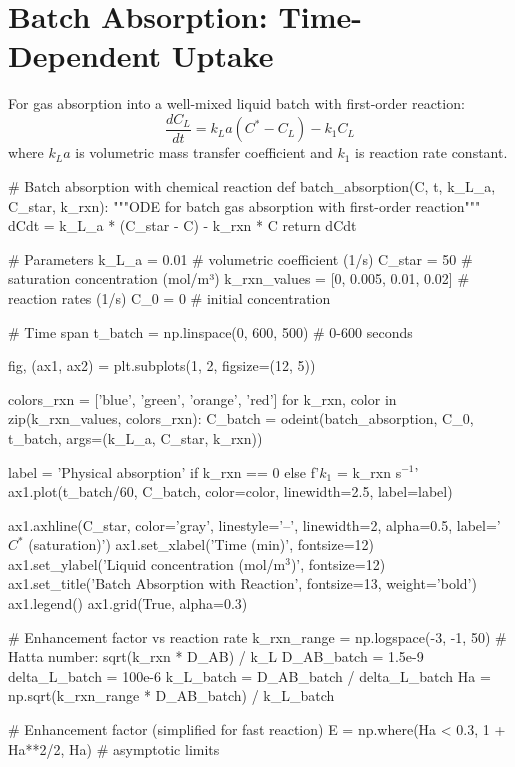 \documentclass[11pt,a4paper]{article}
\begin{document}
\section{Batch Absorption: Time-Dependent Uptake}

For gas absorption into a well-mixed liquid batch with first-order reaction:
\begin{equation}
\frac{dC_L}{dt} = k_L a (C^* - C_L) - k_1 C_L
\end{equation}
where $k_L a$ is volumetric mass transfer coefficient and $k_1$ is reaction rate constant.

\begin{pycode}
# Batch absorption with chemical reaction
def batch_absorption(C, t, k_L_a, C_star, k_rxn):
    """ODE for batch gas absorption with first-order reaction"""
    dCdt = k_L_a * (C_star - C) - k_rxn * C
    return dCdt

# Parameters
k_L_a = 0.01  # volumetric coefficient (1/s)
C_star = 50   # saturation concentration (mol/m³)
k_rxn_values = [0, 0.005, 0.01, 0.02]  # reaction rates (1/s)
C_0 = 0  # initial concentration

# Time span
t_batch = np.linspace(0, 600, 500)  # 0-600 seconds

fig, (ax1, ax2) = plt.subplots(1, 2, figsize=(12, 5))

colors_rxn = ['blue', 'green', 'orange', 'red']
for k_rxn, color in zip(k_rxn_values, colors_rxn):
    C_batch = odeint(batch_absorption, C_0, t_batch, args=(k_L_a, C_star, k_rxn))

    label = 'Physical absorption' if k_rxn == 0 else f'$k_1$ = {k_rxn} s$^{{-1}}$'
    ax1.plot(t_batch/60, C_batch, color=color, linewidth=2.5, label=label)

ax1.axhline(C_star, color='gray', linestyle='--', linewidth=2, alpha=0.5, label='$C^*$ (saturation)')
ax1.set_xlabel('Time (min)', fontsize=12)
ax1.set_ylabel('Liquid concentration (mol/m$^3$)', fontsize=12)
ax1.set_title('Batch Absorption with Reaction', fontsize=13, weight='bold')
ax1.legend()
ax1.grid(True, alpha=0.3)

# Enhancement factor vs reaction rate
k_rxn_range = np.logspace(-3, -1, 50)
# Hatta number: sqrt(k_rxn * D_AB) / k_L
D_AB_batch = 1.5e-9
delta_L_batch = 100e-6
k_L_batch = D_AB_batch / delta_L_batch
Ha = np.sqrt(k_rxn_range * D_AB_batch) / k_L_batch

# Enhancement factor (simplified for fast reaction)
E = np.where(Ha < 0.3, 1 + Ha**2/2, Ha)  # asymptotic limits


\end{pycode}
\end{document}
